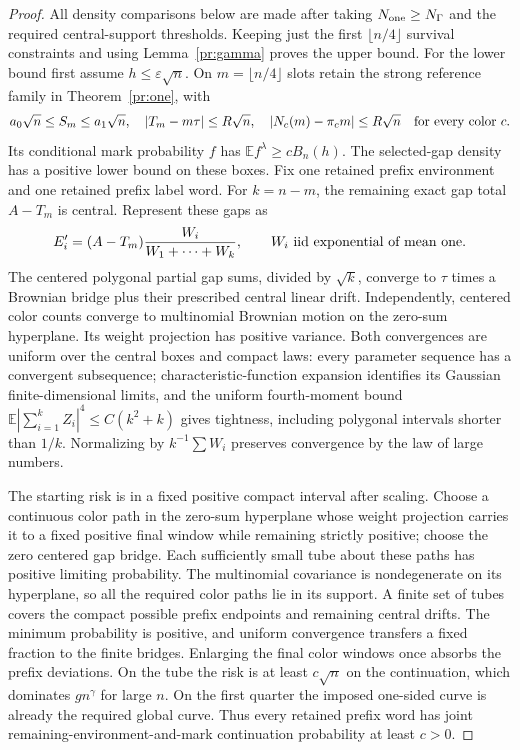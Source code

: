 \begin{proof}
All density comparisons below are made after taking
$N_{\rm one}\ge N_\Gamma$ and the required central-support thresholds.
Keeping just the first $\lfloor n/4\rfloor$ survival constraints and
using Lemma~\ref{pr:gamma} proves the upper bound. For the lower bound
first assume $h\le\varepsilon\sqrt n$. On $m=\lfloor n/4\rfloor$
slots retain the strong reference family in Theorem~\ref{pr:one}, with
\begin{equation}
 a_0\sqrt n\le S_m\le a_1\sqrt n,\quad
 |T_m-m\tau|\le R\sqrt n,\quad
 |N_c(m)-\pi_cm|\le R\sqrt n\quad\hbox{for every color }c.
 \label{pr:prefixboxes}
\end{equation}
Its conditional mark probability $f$ has $\mathbb E f^\lambda\ge cB_n(h)$.
The selected-gap density has a positive lower bound on these boxes.
Fix one retained prefix environment and one retained prefix label word.
For $k=n-m$, the remaining exact gap total $A-T_m$ is central. Represent
these gaps as
\[
 E'_i=(A-T_m)\frac{W_i}{W_1+\cdots+W_k},
 \qquad W_i\hbox{ iid exponential of mean one}.
\]
The centered polygonal partial gap sums, divided by $\sqrt k$, converge
to $\tau$ times a Brownian bridge plus their prescribed central linear
drift. Independently, centered color counts converge to multinomial
Brownian motion on the zero-sum hyperplane. Its weight projection has
positive variance. Both convergences are uniform over the central boxes
and compact laws: every parameter sequence has a convergent subsequence;
characteristic-function expansion identifies its Gaussian finite-dimensional
limits, and the uniform fourth-moment bound
$\mathbb E|\sum_{i=1}^k Z_i|^4\le C(k^2+k)$ gives tightness, including
polygonal intervals shorter than $1/k$. Normalizing by $k^{-1}\sum W_i$
preserves convergence by the law of large numbers.

The starting risk is in a fixed positive compact interval after scaling.
Choose a continuous color path in the zero-sum hyperplane whose weight
projection carries it to a fixed positive final window while remaining
strictly positive; choose the zero centered gap bridge. Each sufficiently
small tube about these paths has positive limiting probability. The
multinomial covariance is nondegenerate on its hyperplane, so all the
required color paths lie in its support. A finite set of tubes covers
the compact possible prefix endpoints and remaining central drifts.
The minimum probability is positive, and uniform convergence transfers
a fixed fraction to the finite bridges. Enlarging the final color windows
once absorbs the prefix deviations. On the tube the risk is at least
$c\sqrt n$ on the continuation, which dominates $gn^\gamma$ for large
$n$. On the first quarter the imposed one-sided curve is already the
required global curve. Thus every retained prefix word has joint
remaining-environment-and-mark continuation probability at least $c>0$.


\end{proof}
